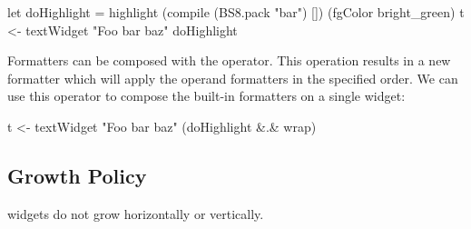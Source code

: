 \begin{haskellcode}
 let doHighlight = highlight (compile (BS8.pack "bar") [])
                     (fgColor bright_green)
 t <- textWidget "Foo bar baz" doHighlight
\end{haskellcode}

Formatters can be composed with the  operator.  This
operation results in a new formatter which will apply the operand
formatters in the specified order.  We can use this operator to
compose the built-in formatters on a single  widget:

\begin{haskellcode}
 t <- textWidget "Foo bar baz" (doHighlight \&.\& wrap)
\end{haskellcode}

\subsection{Growth Policy}

 widgets do not grow horizontally or vertically.

